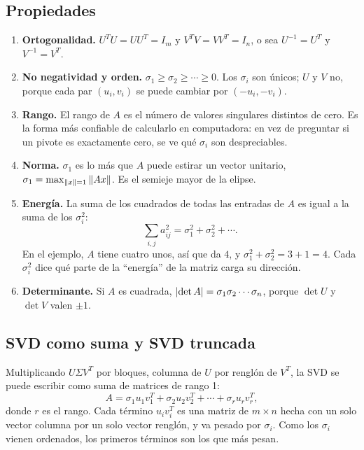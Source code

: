 \documentclass[11pt,letterpaper]{article}
\begin{document}

\subsection*{Propiedades}

\begin{enumerate}[itemsep=0.3em]
    \item \textbf{Ortogonalidad.} $U^{T}U = UU^{T} = I_m$ y
          $V^{T}V = VV^{T} = I_n$, o sea $U^{-1} = U^{T}$ y
          $V^{-1} = V^{T}$.
    \item \textbf{No negatividad y orden.}
          $\sigma_1 \geq \sigma_2 \geq \cdots \geq 0$. Los
          $\sigma_i$ son únicos; $U$ y $V$ no, porque cada par
          $(u_i, v_i)$ se puede cambiar por $(-u_i, -v_i)$.
    \item \textbf{Rango.} El rango de $A$ es el número de valores
          singulares distintos de cero. Es la forma más confiable de
          calcularlo en computadora: en vez de preguntar si un pivote
          es exactamente cero, se ve qué $\sigma_i$ son despreciables.
    \item \textbf{Norma.} $\sigma_1$ es lo más que $A$ puede estirar
          un vector unitario, $\sigma_1 = \max_{\left\lVert x \right\rVert = 1}
          \left\lVert Ax \right\rVert$. Es el semieje mayor de la elipse.
    \item \textbf{Energía.} La suma de los cuadrados de todas las
          entradas de $A$ es igual a la suma de los $\sigma_i^2$:
          \[
              \sum_{i, j} a_{ij}^2 = \sigma_1^2 + \sigma_2^2 + \cdots .
          \]
          En el ejemplo, $A$ tiene cuatro unos, así que da $4$, y
          $\sigma_1^2 + \sigma_2^2 = 3 + 1 = 4$. Cada $\sigma_i^2$
          dice qué parte de la ``energía'' de la matriz carga su
          dirección.
    \item \textbf{Determinante.} Si $A$ es cuadrada,
          $\left\lvert \det A \right\rvert = \sigma_1 \sigma_2 \cdots \sigma_n$, porque
          $\det U$ y $\det V$ valen $\pm 1$.
\end{enumerate}


\subsection*{SVD como suma y SVD truncada}

Multiplicando $U\Sigma V^{T}$ por bloques, columna de $U$ por renglón
de $V^{T}$, la SVD se puede escribir como suma de matrices de rango 1:
\[
    A = \sigma_1 u_1 v_1^{T} + \sigma_2 u_2 v_2^{T} + \cdots
        + \sigma_r u_r v_r^{T} ,
\]
donde $r$ es el rango. Cada término $u_i v_i^{T}$ es una matriz de
$m \times n$ hecha con un solo vector columna por un solo vector
renglón, y va pesado por $\sigma_i$. Como los $\sigma_i$ vienen
ordenados, los primeros términos son los que más pesan.
\end{document}
